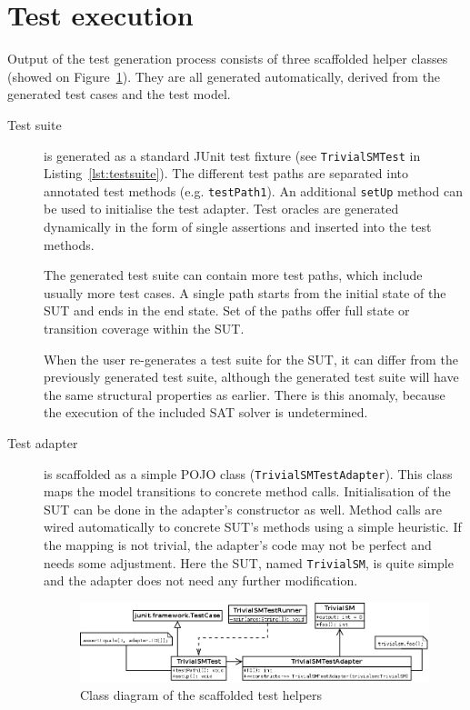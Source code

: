 
\section{Test execution}
\label{sec:testexecutionimplementation}

Output of the test generation process consists of three scaffolded helper classes (showed on Figure~\ref{fig:implementation_testhelpers}). They are all generated automatically, derived from the generated test cases and the test model.
	
\begin{description}
	\item[Test suite] is generated as a standard JUnit test fixture (see \texttt{TrivialSMTest} in Listing~\ref{lst:testsuite}). The different test paths are separated into annotated test methods (e.g. \texttt{testPath1}). An additional \texttt{setUp} method can be used to initialise the test adapter. Test oracles are generated dynamically in the form of single assertions and inserted into the test methods.
	
	The generated test suite can contain more test paths, which include usually more test cases. A single path starts from the initial state of the SUT and ends in the end state. Set of the paths offer full state or transition coverage within the SUT.
	
	When the user re-generates a test suite for the SUT, it can differ from the previously generated test suite, although the generated test suite will have the same structural properties as earlier. There is this anomaly, because the execution of the included SAT solver is undetermined.
	\item[Test adapter] is scaffolded as a simple POJO class (\texttt{TrivialSMTestAdapter}). This class maps the model transitions to concrete method calls. Initialisation of the SUT can be done in the adapter's constructor as well. Method calls are wired automatically to concrete SUT's methods using a simple heuristic. If the mapping is not trivial, the adapter's code may not be perfect and needs some adjustment. Here the SUT, named \texttt{TrivialSM}, is quite simple and the adapter does not need any further modification.
	
\begin{figure}[htp]
\centering
\includegraphics[scale=0.32]{figures/implementation_testhelpers}
\caption{Class diagram of the scaffolded test helpers}
\label{fig:implementation_testhelpers}
\end{figure}


\end{description}
